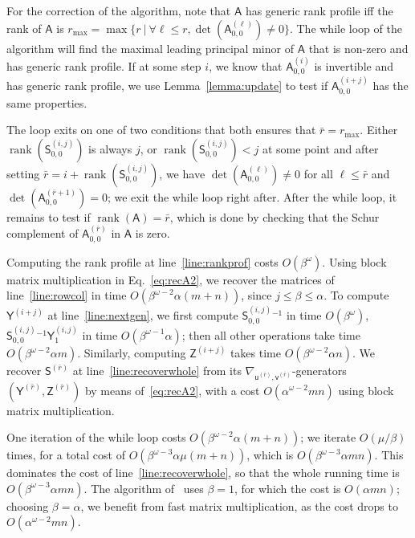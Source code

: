 \documentclass[sigconf]{acmart}
\newcommand{\vu}{\ensuremath{\mathsf{u}}}
\newcommand{\vv}{\ensuremath{\mathsf{v}}}
\newcommand{\mA}{\ensuremath{\mathsf{A}}}
\newcommand{\mS}{\ensuremath{\mathsf{S}}}
\newcommand{\mY}{\ensuremath{\mathsf{Y}}}
\newcommand{\mZ}{\ensuremath{\mathsf{Z}}}
\newcommand{\mn}{\ensuremath{\mu}}
\newcommand{\rank}{\ensuremath{\operatorname{rank}}}
\theoremstyle{acmdefinition}
\begin{document}
For the correction of the algorithm, note that $\mA$ has generic rank
profile iff the rank of $\mA$ is
$r_{\max}=\max\{ r \ |\ \forall \ell \leq r, \det(\mA^{(\ell)}_{0,0})
\neq 0 \}$.
The while loop of the algorithm will find the maximal leading
principal minor of $\mA$ that is non-zero and has generic rank
profile. If at some step $i$, we know that $\mA^{(i)}_{0,0}$ is
invertible and has generic rank profile, we use
Lemma~\ref{lemma:update} to test if $\mA^{(i+j)}_{0,0}$ has the same
properties.

The loop exits on one of two conditions that both ensures that
$\bar{r} = r_{\max}$.  Either $\rank(\mS^{(i,j)}_{0,0})$ is always $j$, or
$\rank(\mS^{(i,j)}_{0,0})<j$ at some point and after setting
$\bar{r}=i+\rank( \mS^{(i,j)}_{0,0})$, we have
$\det(\mA^{(\ell)}_{0,0}) \neq 0$ for all $\ell \leq \bar{r}$ and
$\det(\mA^{(\bar{r}+1)}_{0,0}) = 0$; we exit the while loop right
after.
After the while loop, it remains to test if $\rank(\mA) = \bar{r}$,
which is done by checking that the Schur complement of
$\mA^{(\bar{r})}_{0,0}$ in $\mA$ is zero.



Computing the rank profile at line~\ref{line:rankprof} costs
$O(\beta^\omega)$.  Using block matrix multiplication in
Eq.~\eqref{eq:recA2}, we recover the matrices of
line~\ref{line:rowcol} in time $O(\beta^{\omega-2} \alpha (m+n))$,
since $j \le \beta \le \alpha$.  To compute $\mY^{(i+j)}$ at
line~\ref{line:nextgen}, we first compute $\mS^{(i,j)}_{0,0}{}^{-1}$
in time $O(\beta^{\omega})$, $\mS^{(i,j)}_{0,0}{}^{-1} \mY^{(i,j)}_1$
in time $O(\beta^{\omega-1} \alpha)$; then all other operations take
time $O(\beta^{\omega-2} \alpha m)$.  Similarly, computing
$\mZ^{(i+j)}$ takes time $O(\beta^{\omega-2} \alpha n)$.  We recover
$\mS^{(\bar{r})}$ at line~\ref{line:recoverwhole} from its
$\nabla_{\vu^{(\bar{r})},\vv^{(\bar{r})}}$-generators
$(\mY^{(\bar{r})},\mZ^{(\bar{r})})$ by means of~\eqref{eq:recA2}, with
a cost $O(\alpha^{\omega-2} mn)$ using block matrix multiplication.

One iteration of the while loop costs
$O(\beta^{\omega-2} \alpha (m+n))$; we iterate $O(\mn/\beta)$ times, for
a total cost of $O(\beta^{\omega-3} \alpha \mn(m+n))$, which is
$O(\beta^{\omega-3} \alpha mn)$. This dominates the cost of
line~\ref{line:recoverwhole}, so that the whole running time is
$O(\beta^{\omega-3} \alpha mn)$. The algorithm of~\cite{Mouilleron08}
uses $\beta=1$, for which the cost is $O(\alpha mn)$; choosing
$\beta=\alpha$, we benefit from fast matrix multiplication, as the
cost drops to $O(\alpha^{\omega-2} mn)$.
\end{document}
